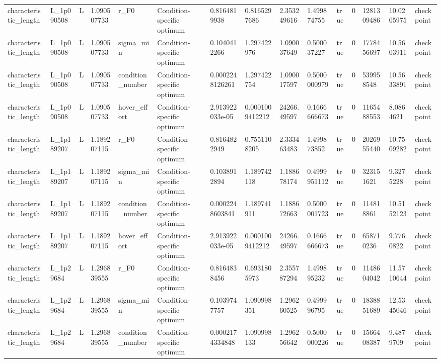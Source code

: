 \begin{tabular}{@{}lllllllllllllll@{}}
characteristic\_length & L\_1p090508 & L & 1.090507733 & r\_F0 & Condition-specific optimum & 0.8164819938 & 0.8165297686 & 2.353249616 & 1.499874755 & true & 0 & 1281309486 & 10.0205975 & checkpoint \\
characteristic\_length & L\_1p090508 & L & 1.090507733 & sigma\_min & Condition-specific optimum & 0.1040412266 & 1.297422976 & 1.090037649 & 0.500037227 & true & 0 & 1778456697 & 10.5603911 & checkpoint \\
characteristic\_length & L\_1p090508 & L & 1.090507733 & condition\_number & Condition-specific optimum & 0.0002248126261 & 1.297422754 & 1.090017597 & 0.5000000979 & true & 0 & 539958548 & 10.5633891 & checkpoint \\
characteristic\_length & L\_1p090508 & L & 1.090507733 & hover\_effort & Condition-specific optimum & 2.913922033e-05 & 0.0001009412212 & 24266.49597 & 0.1666666673 & true & 0 & 1165488553 & 8.0864621 & checkpoint \\
characteristic\_length & L\_1p189207 & L & 1.189207115 & r\_F0 & Condition-specific optimum & 0.8164822949 & 0.7551108205 & 2.333463483 & 1.499873852 & true & 0 & 2026955440 & 10.7509282 & checkpoint \\
characteristic\_length & L\_1p189207 & L & 1.189207115 & sigma\_min & Condition-specific optimum & 0.1038912894 & 1.189742118 & 1.188678174 & 0.4999951112 & true & 0 & 323151621 & 9.3275228 & checkpoint \\
characteristic\_length & L\_1p189207 & L & 1.189207115 & condition\_number & Condition-specific optimum & 0.0002248603841 & 1.189741911 & 1.188672663 & 0.5000001723 & true & 0 & 114818861 & 10.5152123 & checkpoint \\
characteristic\_length & L\_1p189207 & L & 1.189207115 & hover\_effort & Condition-specific optimum & 2.913922033e-05 & 0.0001009412212 & 24266.49597 & 0.1666666673 & true & 0 & 658710236 & 9.7760822 & checkpoint \\
characteristic\_length & L\_1p29684 & L & 1.296839555 & r\_F0 & Condition-specific optimum & 0.8164838456 & 0.6931805973 & 2.355787294 & 1.499895232 & true & 0 & 1148604042 & 11.5710644 & checkpoint \\
characteristic\_length & L\_1p29684 & L & 1.296839555 & sigma\_min & Condition-specific optimum & 0.1039747757 & 1.090998351 & 1.296260525 & 0.499996795 & true & 0 & 1838851689 & 12.5345046 & checkpoint \\
characteristic\_length & L\_1p29684 & L & 1.296839555 & condition\_number & Condition-specific optimum & 0.0002174334848 & 1.090998133 & 1.296256642 & 0.5000000226 & true & 0 & 1566408387 & 9.4879709 & checkpoint \\

\end{tabular}
